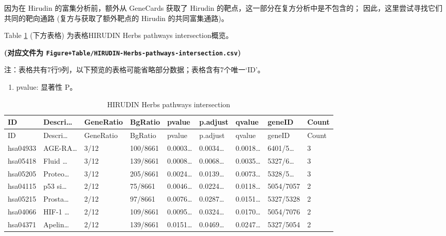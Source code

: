 \documentclass[
]{article}
\providecommand{\tightlist}{%
  \setlength{\itemsep}{0pt}\setlength{\parskip}{0pt}}
\begin{document}
因为在 Hirudin 的富集分析前，额外从 GeneCards 获取了 Hirudin 的靶点，这一部分在复方分析中是不包含的；
因此，这里尝试寻找它们共同的靶向通路 (复方与获取了额外靶点的 Hirudin 的共同富集通路)。

Table \ref{tab:HIRUDIN-Herbs-pathways-intersection} (下方表格) 为表格HIRUDIN Herbs pathways intersection概览。

\textbf{(对应文件为 \texttt{Figure+Table/HIRUDIN-Herbs-pathways-intersection.csv})}

\begin{center}\begin{tcolorbox}[colback=gray!10, colframe=gray!50, width=0.9\linewidth, arc=1mm, boxrule=0.5pt]注：表格共有7行9列，以下预览的表格可能省略部分数据；表格含有7个唯一`ID'。
\end{tcolorbox}
\end{center}
\begin{center}\begin{tcolorbox}[colback=gray!10, colframe=gray!50, width=0.9\linewidth, arc=1mm, boxrule=0.5pt]\begin{enumerate}\tightlist
\item pvalue:  显著性 P。
\end{enumerate}\end{tcolorbox}
\end{center}

\begin{longtable}[]{@{}lllllllll@{}}
\caption{\label{tab:HIRUDIN-Herbs-pathways-intersection}HIRUDIN Herbs pathways intersection}\tabularnewline
\toprule
ID & Descri\ldots{} & GeneRatio & BgRatio & pvalue & p.adjust & qvalue & geneID & Count\tabularnewline
\midrule
\endfirsthead
\toprule
ID & Descri\ldots{} & GeneRatio & BgRatio & pvalue & p.adjust & qvalue & geneID & Count\tabularnewline
\midrule
\endhead
hsa04933 & AGE-RA\ldots{} & 3/12 & 100/8661 & 0.0003\ldots{} & 0.0034\ldots{} & 0.0018\ldots{} & 6401/5\ldots{} & 3\tabularnewline
hsa05418 & Fluid \ldots{} & 3/12 & 139/8661 & 0.0008\ldots{} & 0.0068\ldots{} & 0.0035\ldots{} & 5327/6\ldots{} & 3\tabularnewline
hsa05205 & Proteo\ldots{} & 3/12 & 205/8661 & 0.0024\ldots{} & 0.0139\ldots{} & 0.0073\ldots{} & 5328/5\ldots{} & 3\tabularnewline
hsa04115 & p53 si\ldots{} & 2/12 & 75/8661 & 0.0046\ldots{} & 0.0224\ldots{} & 0.0118\ldots{} & 5054/7057 & 2\tabularnewline
hsa05215 & Prosta\ldots{} & 2/12 & 97/8661 & 0.0076\ldots{} & 0.0287\ldots{} & 0.0151\ldots{} & 5327/5328 & 2\tabularnewline
hsa04066 & HIF-1 \ldots{} & 2/12 & 109/8661 & 0.0095\ldots{} & 0.0324\ldots{} & 0.0170\ldots{} & 5054/7076 & 2\tabularnewline
hsa04371 & Apelin\ldots{} & 2/12 & 139/8661 & 0.0151\ldots{} & 0.0469\ldots{} & 0.0247\ldots{} & 5327/5054 & 2\tabularnewline
\bottomrule
\end{longtable}
\end{document}
